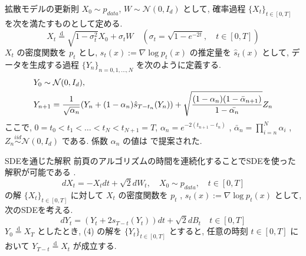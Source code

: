 \documentclass[11pt]{beamer}
\theoremstyle{plain}
\theoremstyle{definition}
\renewcommand{\cite}[1]{\citep{#1}}
\begin{document}
    \begin{frame}{拡散モデルの更新則}
      $X_0\sim p_{data}$, $W \sim \mathcal{N}(0,I_d)$ として, 確率過程 $\{X_t\}_{t\in[0,T]}$ を次を満たすものとして定める.
      \begin{equation}
         X_t\stackrel{\mathrm{d}}{=}\sqrt{1-\sigma^2_t}X_0+\sigma_tW \quad (\sigma_t=\sqrt{1-e^{-2t}}, \quad t\in[0,T])
      \end{equation}
      $X_t$ の密度関数を $p_t$ とし, $s_t(x):=\nabla\log{p_t(x)}$ の推定量を $\hat{s}_t(x)$ として, データを生成する過程 $\{Y_n\}_{n=0,1,\dots, N}$ を次のように定義する.
      \begin{align}
          &Y_0\sim \mathcal{N}(0,I_d), \notag\\
          &Y_{n+1}=\frac{1}{\sqrt{\alpha_n}}(Y_{n}+(1-\alpha_n)\hat{s}_{T-t_n}(Y_{n}))+\sqrt{\frac{(1-\alpha_n)(1-\bar{\alpha}_{n+1})}{1-\bar{\alpha_n}}}Z_n
      \end{align}
      ここで, $0=t_0<t_1<\dots < t_N<t_{N+1}=T$, $\alpha_n=e^{-2(t_{n+1}-t_n)}$ , $\bar{\alpha}_n=\prod\limits_{i=n}^N \alpha_i$ , $Z_n\overset{iid}{\sim}\mathcal{N}(0,I_d)$ である. 係数 $\alpha_n$ の値は \cite{ho_jain_abbeel_2020} で提案された.
    \end{frame}
    \begin{frame}{SDEを通じた解釈}
      前頁のアルゴリズムの時間を連続化することでSDEを使った解釈が可能である \cite{song_et_al_2021} .
      \begin{equation}
          dX_t=-X_tdt+\sqrt{2}dW_t, \quad X_0\sim p_{data}, \quad t\in[0,T]
      \end{equation}
      の解 $\{X_t\}_{t\in[0,T]}$ に対して $X_t$ の密度関数を $p_t$ , $s_t(x):=\nabla\log{p_t(x)}$ として, 次のSDEを考える.
      \begin{equation}
          dY_t=(Y_t+2s_{T-t}(Y_t))dt+\sqrt{2}dB_t \quad t\in[0,T]
      \end{equation}
      $Y_0\stackrel{\mathrm{d}}{=} X_T$ としたとき, (4) の解を $\{Y_t\}_{t\in[0,T]}$ とすると, 任意の時刻 $t\in [0,T]$ において
      $Y_{T-t}\stackrel{\mathrm{d}}{=}X_t$ が成立する\cite{anderson82}.
    \end{frame}
\end{document}
